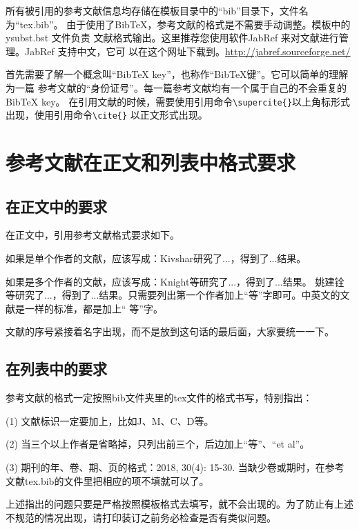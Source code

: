 %


\label{chap:bib}

所有被引用的参考文献信息均存储在模板目录中的“bib”目录下，文件名为“tex.bib”。
由于使用了BibTeX，参考文献的格式是不需要手动调整。模板中的ysubst.bst 文件负责
文献格式输出。这里推荐您使用软件JabRef 来对文献进行管理。JabRef 支持中文，它可
以在这个网址下载到。\url{http://jabref.sourceforge.net/}

首先需要了解一个概念叫“BibTeX key”，也称作“BibTeX键”。它可以简单的理解为一篇
参考文献的“身份证号”。每一篇参考文献均有一个属于自己的不会重复的BibTeX key。
在引用文献的时候，需要使用引用命令\verb|\supercite{}|以上角标形式出现，使用引用命令\verb|\cite{}| 以正文形式出现。

\section{参考文献在正文和列表中格式要求}

\subsection{在正文中的要求}

在正文中，引用参考文献格式要求如下。

如果是单个作者的文献，应该写成：Kivshar\supercite{Kivshar2008}研究了...，得到了...结果。

如果是多个作者的文献，应该写成：Knight等\supercite{liu2021}研究了...，得到了...结果。
姚建铨等\supercite{yaojianquan2009}研究了...，得到了...结果。只需要列出第一个作者加上``等''字即可。中英文的文献是一样的标准，都是加上`` 等''字。

文献的序号紧接着名字出现，而不是放到这句话的最后面，大家要统一一下。

\subsection{在列表中的要求}

参考文献的格式一定按照bib文件夹里的tex文件的格式书写，特别指出：

(1) 文献标识一定要加上，比如J、M、C、D等。

(2) 当三个以上作者是省略掉，只列出前三个，后边加上``等''、``et al''。

(3) 期刊的年、卷、期、页的格式：2018, 30(4): 15-30. 当缺少卷或期时，在参考文献tex.bib的文件里把相应的项不填就可以了。

上述指出的问题只要是严格按照模板格式去填写，就不会出现的。为了防止有上述不规范的情况出现，请打印装订之前务必检查是否有类似问题。


